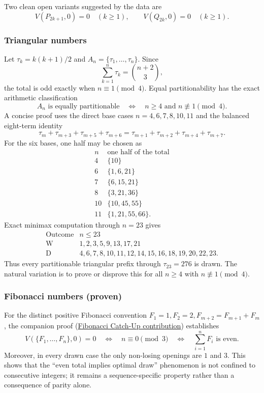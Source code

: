 \documentclass[11pt,a4paper]{article}
\begin{document}
Two clean open variants suggested by the data are
\[
V(P_{2k+1},0)=0\quad(k\ge1),
\qquad
V(Q_{2k},0)=0\quad(k\ge1).
\]

\subsubsection*{Triangular numbers}
Let $\tau_k=k(k+1)/2$ and $A_n=\{\tau_1,\ldots,\tau_n\}$.  Since
\[
\sum_{k=1}^n\tau_k=\binom{n+2}{3},
\]
the total is odd exactly when $n\equiv1\pmod4$.  Equal partitionability has the exact arithmetic classification
\[
A_n\text{ is equally partitionable}\quad\Longleftrightarrow\quad n\ge4\text{ and }n\not\equiv1\pmod4.
\]
A concise proof uses the direct base cases $n=4,6,7,8,10,11$ and the balanced eight-term identity
\[
\tau_m+\tau_{m+3}+\tau_{m+5}+\tau_{m+6}
=\tau_{m+1}+\tau_{m+2}+\tau_{m+4}+\tau_{m+7}.
\]
For the six bases, one half may be chosen as
\[
\begin{array}{c|c}
n & \text{one half of the total}\\ \hline
4&\{10\}\\
6&\{1,6,21\}\\
7&\{6,15,21\}\\
8&\{3,21,36\}\\
10&\{10,45,55\}\\
11&\{1,21,55,66\}.
\end{array}
\]
Exact minimax computation through $n=23$ gives
\[
\begin{array}{c|l}
\text{Outcome} & n\le23\\ \hline
\mathrm{W} & 1,2,3,5,9,13,17,21\\
\mathrm{D} & 4,6,7,8,10,11,12,14,15,16,18,19,20,22,23.
\end{array}
\]
Thus every partitionable triangular prefix through $\tau_{23}=276$ is drawn.  The natural variation is to prove or disprove this for all $n\ge4$ with $n\not\equiv1\pmod4$.


\subsubsection*{Fibonacci numbers (proven)}
For the distinct positive Fibonacci convention $F_1=1,F_2=2,F_{m+2}=F_{m+1}+F_m$, the companion proof (\href{https://we-solve.github.io/contributions/the-catch-up-optimal-draw-conjecture-for-consecutive-integers/attempt-4/r1/}{Fibonacci Catch-Up contribution}) establishes
\[
V(\{F_1,\ldots,F_n\},0)=0
\quad\Longleftrightarrow\quad
n\equiv0\pmod3
\quad\Longleftrightarrow\quad
\sum_{i=1}^nF_i\text{ is even}.
\]
Moreover, in every drawn case the only non-losing openings are $1$ and $3$.  This shows that the ``even total implies optimal draw'' phenomenon is not confined to consecutive integers; it remains a sequence-specific property rather than a consequence of parity alone.
\end{document}
